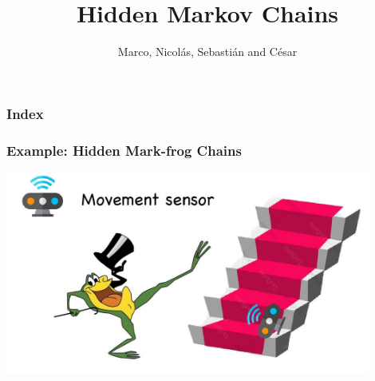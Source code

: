 \documentclass[xcolor=dvipsnames, compress]{beamer}
\title[Hidden Markov Chains]{Hidden Markov Chains}
\author{Marco, Nicolás, Sebastián and César}
\institute[ITAM]
\begin{document}
%
\begin{frame}
\titlepage
\end{frame}

\begin{frame}
\frametitle{Index}
 \tableofcontents%
\end{frame}

\begin{frame}
\frametitle{Example: Hidden Mark-frog Chains}
\begin{center}
	\includegraphics[width=0.9\textwidth]{images/frog_ladder.jpg}
\end{center}

\end{frame}
\end{document}
